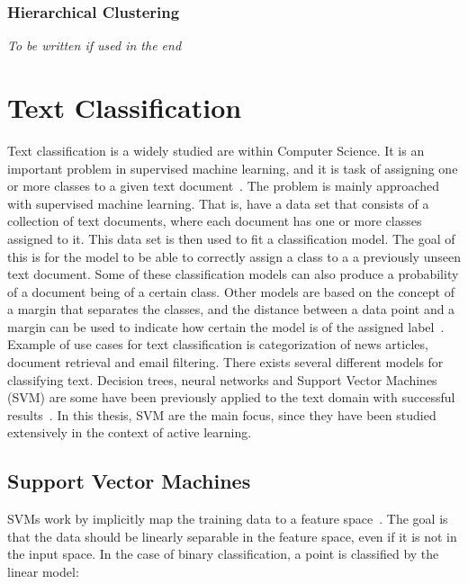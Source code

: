 \subsubsection{Hierarchical Clustering}

\textit{To be written if used in the end}

\section{Text Classification}

Text classification is a widely studied are within Computer Science.
It is an important problem in supervised machine learning, and it is task of assigning one or more classes to a given text document~\cite{aggarwal2012surveyclass}.
The problem is mainly approached with supervised machine learning.
That is, have a data set that consists of a collection of text documents, where each document has one or more classes assigned to it. %
This data set is then used to fit a classification model. 
The goal of this is for the model to be able to correctly assign a class to a a previously unseen text document.
Some of these classification models can also produce a probability of a document being of a certain class.
Other models are based on the concept of a margin that separates the classes, and the distance between a data point and a margin can be used to indicate how certain the model is of the assigned label~\cite{tong2001support}.
Example of use cases for text classification is categorization of news articles, document retrieval and email filtering.
There exists several different models for classifying text.
Decision trees, neural networks and Support Vector Machines (SVM) are some have been previously applied to the text domain with successful results~\cite{aggarwal2012survey}.
In this thesis, SVM are the main focus, since they have been studied extensively in the context of active learning. %

\subsection{Support Vector Machines}

SVMs work by implicitly map the training data to a feature space~\cite{bishop2006pattern}.
The goal is that the data should be linearly separable in the feature space, even if it is not in the input space.
In the case of binary classification, a point is classified by the linear model:

